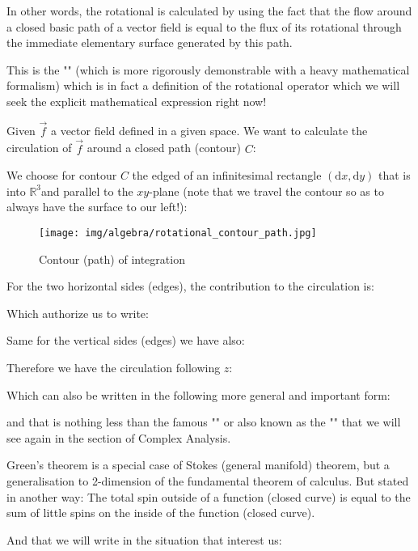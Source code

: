 	\begin{theorem}
	In other words, the rotational is calculated by using the fact that the flow around a closed basic path of a vector field is equal to the flux of its rotational through the immediate elementary surface generated by this path.

	This is the "\label{stokes theorem}" (which is more rigorously demonstrable with a heavy mathematical formalism) which is in fact a definition of the rotational operator which we will seek the explicit mathematical expression right now!
	\end{theorem}
	\begin{dem}
	Given $\vec{f}$ a vector field defined in a given space. We want to calculate the circulation of $\vec{f}$ around a closed path (contour) $C$:
	
	We choose for contour $C$ the edged of an infinitesimal rectangle $(\mathrm{d}x,\mathrm{d}y)$ that is into $\mathbb{R}^3$and parallel to the $xy$-plane (note that we travel the contour so as to always have the surface to our left!):
	\begin{figure}[H]
		\centering
		\texttt{[image: img/algebra/rotational\_contour\_path.jpg]}
		\caption[]{Contour (path) of integration}
	\end{figure}
	For the two horizontal sides (edges), the contribution to the circulation is:
	
	Which authorize us to write:
	
	Same for the vertical sides  (edges) we have also:
	
	Therefore we have the circulation following $z$:
	
	Which can also be written in the following more general and important form:
	
	and that is nothing less than the famous "\label{green theorem}" or also known as the "" that we will see again in the section of Complex Analysis.
	
	Green's theorem is a special case of Stokes (general manifold) theorem, but a generalisation to 2-dimension of the fundamental theorem of calculus. But stated in another way: The total spin outside of a function (closed curve) is equal to the sum of little spins on the inside of the function (closed curve).
	
	And that we will write in the situation that interest us:
	

\end{dem}
